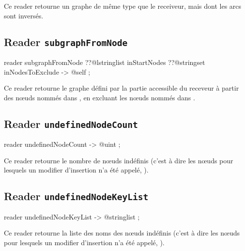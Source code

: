 Ce reader retourne un graphe de même type que le receiveur, mais dont les arcs sont inversés.





\subsection{Reader \texttt{subgraphFromNode}}

\begin{galgascode}
reader subgraphFromNode
  ??@lstringlist inStartNodes
  ??@stringset inNodesToExclude
  -> @self ;
\end{galgascode}

Ce reader retourne le graphe défini par la partie accessible du receveur à partir des nœuds nommés dans , en excluant les nœuds nommés dans .






\subsection{Reader \texttt{undefinedNodeCount}}

\begin{galgascode}
reader undefinedNodeCount -> @uint ;
\end{galgascode}

Ce reader retourne le nombre de nœuds indéfinis (c'est à dire les nœuds pour lesquels un modifier d'insertion n'a été appelé, ).







\subsection{Reader \texttt{undefinedNodeKeyList}}

\begin{galgascode}
reader undefinedNodeKeyList -> @stringlist ;
\end{galgascode}

Ce reader retourne la liste des noms des nœuds indéfinis (c'est à dire les nœuds pour lesquels un modifier d'insertion n'a été appelé, ).








